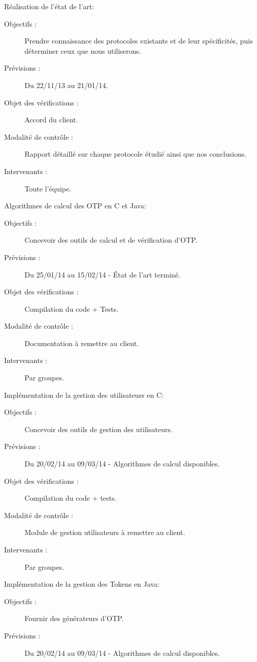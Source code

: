 \documentclass{../../res/univ-projet}
\begin{document}
\begin{description}
	\item Réalisation de l'état de l'art:
	\begin{description}
		\item[Objectifs :] Prendre connaissance des protocoles existants et de leur spécificités, puis déterminer ceux que nous utiliserons.
		\item[Prévisions :] Du 22/11/13 au 21/01/14.
		\item[Objet des vérifications :] Accord du client.
		\item[Modalité de contrôle :] Rapport détaillé sur chaque protocole étudié ainsi que nos conclusions.
		\item[Intervenants :] Toute l'équipe.
	\end{description}
	\vfill
	\item Algorithmes de calcul des OTP en C et Java:
	\begin{description}
		\item[Objectifs :] Concevoir des outils de calcul et de vérification d'OTP.
		\item[Prévisions :] Du 25/01/14 au 15/02/14 - État de l'art terminé.
		\item[Objet des vérifications :] Compilation du code + Tests.
		\item[Modalité de contrôle :] Documentation à remettre au client.
		\item[Intervenants :] Par groupes.
	\end{description}
	\vfill
	\item Implémentation de la gestion des utilisateurs en C:
	\begin{description}
		\item[Objectifs :] Concevoir des outils de gestion des utilisateurs.
		\item[Prévisions :] Du 20/02/14 au 09/03/14 - Algorithmes de calcul disponibles.
		\item[Objet des vérifications :] Compilation du code + tests.
		\item[Modalité de contrôle :] Module de gestion utilisateurs à remettre au client.
		\item[Intervenants :] Par groupes.
	\end{description}
	\vfill
	\item Implémentation de la gestion des Tokens en Java:
	\begin{description}
		\item[Objectifs :] Fournir des générateurs d'OTP.
		\item[Prévisions :] Du 20/02/14 au 09/03/14 - Algorithmes de calcul disponibles.

\end{description}
\end{description}
\end{document}
